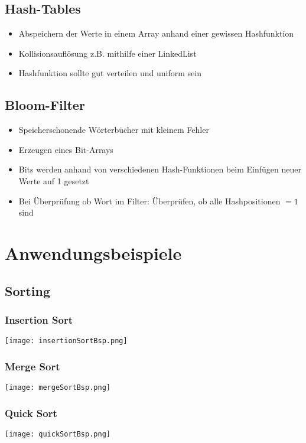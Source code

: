     \subsection{Hash-Tables}
        \begin{itemize}
            \item Abspeichern der Werte in einem Array anhand einer gewissen Hashfunktion
            \item Kollisionsauflösung z.B. mithilfe einer LinkedList
            \item Hashfunktion sollte gut verteilen und uniform sein
        \end{itemize}

    \subsection{Bloom-Filter}
        \begin{itemize}
            \item Speicherschonende Wörterbücher mit kleinem Fehler
            \item Erzeugen eines Bit-Arrays
            \item Bits werden anhand von verschiedenen Hash-Funktionen beim Einfügen neuer Werte auf 1 gesetzt
            \item Bei Überprüfung ob Wort im Filter: Überprüfen, ob alle Hashpositionen $= 1$ sind
        \end{itemize}

\section{Anwendungsbeispiele}
    \subsection{Sorting}

        \subsubsection{Insertion Sort}
        \centerline{\texttt{[image: insertionSortBsp.png]}}

        \subsubsection{Merge Sort}
        \centerline{\texttt{[image: mergeSortBsp.png]}}

        \subsubsection{Quick Sort}
        \centerline{\texttt{[image: quickSortBsp.png]}}

